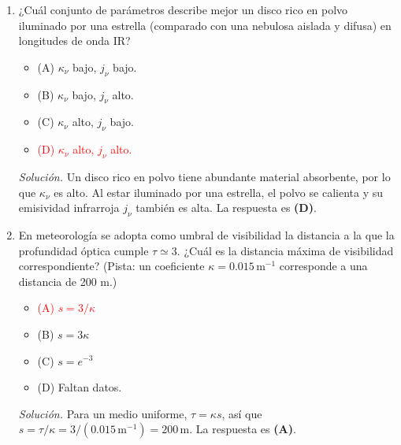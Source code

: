 \documentclass[11pt]{article}
\begin{document}
\begin{enumerate}
    \item ¿Cuál conjunto de parámetros describe mejor un disco rico en polvo iluminado por una estrella (comparado con una nebulosa aislada y difusa) en longitudes de onda IR?
    \begin{itemize}
        \item (A) $\kappa_\nu$ bajo, $j_\nu$ bajo.
        \item (B) $\kappa_\nu$ bajo, $j_\nu$ alto.
        \item (C) $\kappa_\nu$ alto, $j_\nu$ bajo.
        \item \textcolor{red}{(D) $\kappa_\nu$ alto, $j_\nu$ alto.}
    \end{itemize}
    \textit{Solución.} Un disco rico en polvo tiene abundante material absorbente, por lo que $\kappa_\nu$ es alto. Al estar iluminado por una estrella, el polvo se calienta y su emisividad infrarroja $j_\nu$ también es alta. La respuesta es \textbf{(D)}. \parencite[Secs. 13.4 y 14.8.7--14.8.8, pp. 398, 469--470]{chaparro2026}

    \item En meteorología se adopta como umbral de visibilidad la distancia a la que la profundidad óptica cumple $\tau\simeq3$. ¿Cuál es la distancia máxima de visibilidad correspondiente? (Pista: un coeficiente $\kappa=0.015\,\mathrm{m}^{-1}$ corresponde a una distancia de 200 m.)
    \begin{itemize}
        \item \textcolor{red}{(A) $s=3/\kappa$}
        \item (B) $s=3\kappa$
        \item (C) $s=e^{-3}$
        \item (D) Faltan datos.
    \end{itemize}
    \textit{Solución.} Para un medio uniforme, $\tau=\kappa s$, así que $s=\tau/\kappa=3/(0.015\,\mathrm{m}^{-1})=200\,\mathrm{m}$. La respuesta es \textbf{(A)}. \parencite[Secs. 13.3.1 y 13.3.3, pp. 394--396]{chaparro2026}


\end{enumerate}
\end{document}
